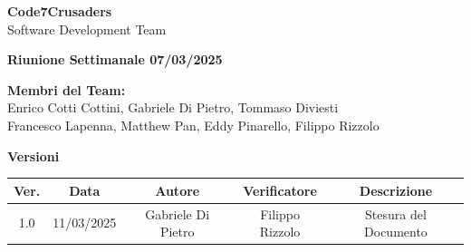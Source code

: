 \documentclass{article}
\begin{document}
\begin{titlepage}
    {\Huge \textbf{Code7Crusaders}}\\
    \vspace{0.5cm}
    {\Large Software Development Team}\\
    \vspace{2cm}
        
        {\large \textbf{Riunione Settimanale 07/03/2025}}\\
    \vspace{5cm}                           %
    
    
    \textbf{Membri del Team:}\\
    Enrico Cotti Cottini, Gabriele Di Pietro, Tommaso Diviesti \\
    Francesco Lapenna, Matthew Pan, Eddy Pinarello, Filippo Rizzolo \\
    \vspace{0.5cm}
    
    \vspace{1cm}
\end{titlepage}



\newpage
\begin{table}[h!]
\centering
\textbf{Versioni} \\ %
\vspace{2mm} %
\begin{tabular}{|c|c|c|c|c|}
    \hline
    \textbf{Ver.} & \textbf{Data} & \textbf{Autore} & \textbf{Verificatore} & \textbf{Descrizione} \\
    \hline
    1.0 & 11/03/2025 & Gabriele Di Pietro & Filippo Rizzolo & Stesura del Documento \\ 
    \hline                                  %
\end{tabular}
\end{table}
\vspace{3cm}
\tableofcontents



\newpage
\end{document}
